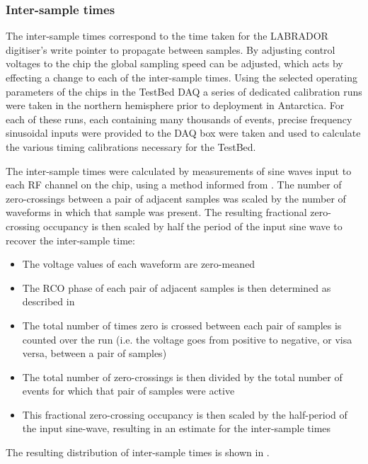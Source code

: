 \subsubsection{Inter-sample times}
\label{sec:calibration:LABRADOR-Digitiser-Chip:Inter-sample-times}

The inter-sample times correspond to the time taken for the LABRADOR digitiser's write pointer to propagate between samples. By adjusting control voltages to the chip the global sampling speed can be adjusted, which acts by effecting a change to each of the inter-sample times. Using the selected operating parameters of the chips in the TestBed DAQ a series of dedicated calibration runs were taken in the northern hemisphere prior to deployment in Antarctica. For each of these runs, each containing many thousands of events,  precise frequency sinusoidal inputs were provided to the DAQ box were taken and used to calculate the various timing calibrations necessary for the TestBed. 

The inter-sample times were calculated by measurements of sine waves input to each RF channel on the chip, using a method informed from \cite{AbbyThesis}. The number of zero-crossings between a pair of adjacent samples was scaled by the number of waveforms in which that sample was present. The resulting fractional zero-crossing occupancy is then scaled by half the period of the input sine wave to recover the inter-sample time:

\begin{itemize}
\item The voltage values of each waveform are zero-meaned 
\item The RCO phase of each pair of adjacent samples is then determined as described in 
\item The total number of times zero is crossed between each pair of samples is counted over the run (i.e. the voltage goes from positive to negative, or visa versa, between a pair of samples)
\item The total number of zero-crossings is then divided by the total number of events for which that pair of samples were active
\item This fractional zero-crossing occupancy is then scaled by the half-period of the input sine-wave, resulting in an estimate for the inter-sample times
\end{itemize}


The resulting distribution of inter-sample times is shown in . 

